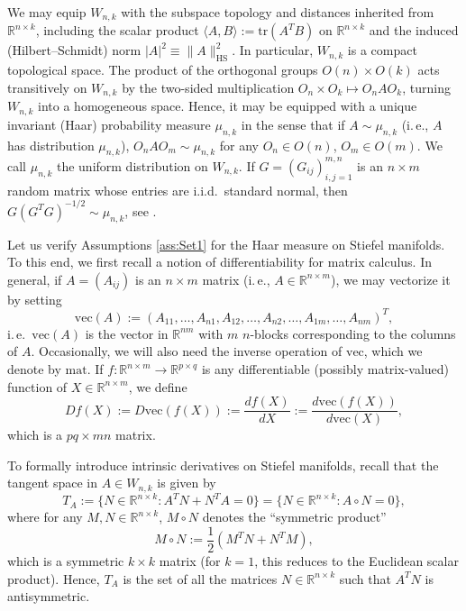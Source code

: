 \documentclass[a4paper,12pt]{amsart}
\numberwithin{equation}{section}
\theoremstyle{remark}
\def\cs{\circ}
\begin{document}
We may equip $W_{n,k}$ with the subspace topology and distances inherited from $\mathbb{R}^{n \times k}$, including the scalar product $\langle A, B\rangle:=\mathrm{tr}(A^T B)$ on $\mathbb{R}^{n\times k}$ and the induced (Hilbert--Schmidt) norm $\lvert A \rvert^2 \equiv \lVert A\rVert_\mathrm{HS}^2$. In particular, $W_{n,k}$ is a compact topological space. The product of the orthogonal groups $O(n) \times O(k) $ acts transitively on $W_{n,k}$ by the two-sided multiplication $O_n \times O_k \mapsto O_nAO_k$, turning $W_{n,k}$ into a homogeneous space. Hence, it may be equipped with a unique invariant (Haar) probability measure $\mu_{n,k}$ in the sense that if $A \sim \mu_{n,k}$ (i.\,e., $A$ has distribution $\mu_{n,k}$), $O_nAO_m \sim \mu_{n,k}$ for any $O_n \in O(n)$, $O_m \in O(m)$. We call $\mu_{n,k}$ the uniform distribution on $W_{n,k}$. If $G = (G_{ij})_{i,j=1}^{m,n}$ is an $n \times m$ random matrix whose entries are i.i.d.\ standard normal, then $G(G^TG)^{-1/2} \sim \mu_{n,k}$, see \cite[Le.\ 3.1]{KPT20}.

Let us verify Assumptions \ref{ass:Set1} for the Haar measure on Stiefel manifolds. To this end, we first recall a notion of differentiability for matrix calculus. In general, if $A = (A_{ij})$ is an $n \times m$ matrix (i.\,e., $A \in \mathbb{R}^{n \times m}$), we may vectorize it by setting
\begin{equation}\label{eq:vec}
\mathrm{vec}(A)  := (A_{11}, \ldots, A_{n1}, A_{12}, \ldots, A_{n2}, \ldots, A_{1m},\ldots, A_{nm})^T,
\end{equation}
i.\,e.\ $\mathrm{vec}(A)$ is the vector in $\mathbb{R}^{nm}$ with $m$ $n$-blocks corresponding to the columns of $A$. Occasionally, we will also need the inverse operation of $\mathrm{vec}$, which we denote by $\mathrm{mat}$. If $f \colon \mathbb{R}^{n\times m} \to \mathbb{R}^{p\times q}$ is any differentiable (possibly matrix-valued) function of $X \in \mathbb{R}^{n \times m}$, we define
\begin{equation}\label{eq:matrixderiv}
Df(X) := D\mathrm{vec}(f(X)) := \frac{d f(X)}{dX} := \frac{d \mathrm{vec}(f(X))}{d \mathrm{vec}(X)},
\end{equation}
which is a $pq \times mn$ matrix.

To formally introduce intrinsic derivatives on Stiefel manifolds, recall that the tangent space in $A \in W_{n,k}$ is given by
\[
T_A:= \{  N \in \mathbb{R}^{n \times k} : A^T N + N^T A = 0\} = \{  N \in \mathbb{R}^{n \times k} : A \cs N = 0\},
\]
where for any $M, N \in \mathbb{R}^{n \times k}$, $M \cs N$ denotes the ``symmetric product''
\[
M \cs N := \frac{1}{2} (M^T N + N^T M),
\]
which is a symmetric $k \times k$ matrix (for $k=1$, this reduces to the Euclidean scalar product). Hence, $T_A$ is the set of all the matrices $N \in \mathbb{R}^{n \times k}$ such that $A^TN$ is antisymmetric.
\end{document}
